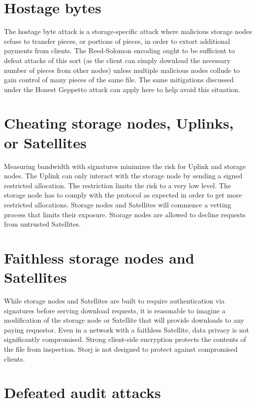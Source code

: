 \documentclass[8pt,fleqn,openany]{book}
\begin{document}
\section{Hostage bytes}

The hostage byte attack is a storage-specific attack where malicious storage
nodes
refuse to transfer pieces, or portions of pieces, in order to extort additional
payments from clients. The Reed-Solomon encoding ought to be sufficient to
defeat attacks of this sort (as the client can simply download the necessary
number of pieces from other nodes) unless multiple malicious nodes collude to
gain control of many pieces of the same file. The same mitigations discussed
under the Honest Geppetto attack can apply here to help avoid this situation.

\section{Cheating storage nodes, Uplinks, or Satellites}

Measuring bandwidth with signatures minimizes the risk for Uplink and storage
nodes.
The Uplink can only interact with the storage node by sending a signed
restricted allocation.
The restriction limits the risk to a very low level.
The storage node has to comply with the protocol as expected in order to get
more restricted allocations.
Storage nodes and Satellites will commence a vetting process that limits their
exposure.
Storage nodes are allowed to decline requests from untrusted Satellites.

\section{Faithless storage nodes and Satellites}

While storage nodes and Satellites are built to require authentication via
signatures before serving download requests, it is reasonable to imagine a
modification of the storage node or Satellite that will provide downloads to
any paying requestor.
Even in a network with a faithless Satellite, data privacy is not significantly
compromised.
Strong client-side encryption protects the contents of the file from
inspection.
Storj is not designed to protect against compromised clients.

\section{Defeated audit attacks}
\end{document}
